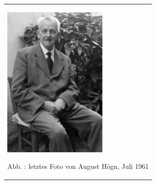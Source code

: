 \begin{center}
\begin{minipage}{5.542cm}
\begin{flushleft}
\tablefirsthead{}
\tablehead{}
\tabletail{}
\tablelasttail{}
\begin{supertabular}{m{5.342cm}}

\includegraphics[width=5.159cm,height=7.606cm]{pictures/zulassungsarbeit-img056.jpg}

Abb. : letztes Foto von August Högn, Juli
1961\\
\end{supertabular}
\end{flushleft}
\end{minipage}
\end{center}
